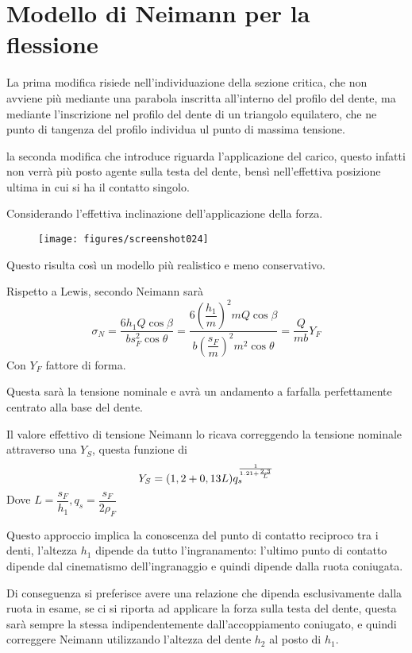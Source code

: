 \documentclass[a4paper, 15pt]{article}
\begin{document}
\section{Modello di Neimann per la flessione}
\begin{adjustwidth}{2in}{}	
	La prima modifica risiede nell'individuazione della sezione critica, che non avviene più mediante una parabola inscritta all'interno del profilo del dente, ma mediante l'inscrizione nel profilo del dente di un triangolo equilatero, che ne punto di tangenza del profilo individua ul punto di massima tensione. 
	
	la seconda modifica che introduce riguarda l'applicazione del carico, questo infatti non verrà più posto agente sulla testa del dente, bensì nell'effettiva posizione ultima in cui si ha il contatto singolo. 
	
	Considerando l'effettiva inclinazione dell'applicazione della forza. 
	\begin{figure}[H]
		\centering
		\texttt{[image: figures/screenshot024]}
		\label{fig:screenshot024}
	\end{figure}
	Questo risulta così un modello più realistico e meno conservativo.\newline 
	
	Rispetto a Lewis, secondo Neimann sarà 
	\[\sigma_N = \dfrac{6h_1Q\cos\beta}{bs_F^2\cos\theta} = \dfrac{6\left(\dfrac{h_1}{m}\right)^2mQ\cos\beta}{b\left(\dfrac{s_F}{m}\right)^2m^2\cos\theta} = \dfrac{Q}{mb}Y_F\] 
	Con $Y_F$ fattore di forma. 
	
	Questa sarà la tensione nominale e avrà un andamento a farfalla perfettamente centrato alla base del dente. \newline 
	
	Il valore effettivo di tensione Neimann lo ricava correggendo la tensione nominale attraverso una $Y_S$, questa funzione di 
	\[Y_S=(1,2+0,13L)q_s^{{1\over1.21 + {2.3\over L}}}\]
	Dove $L=\dfrac{s_F}{h_1}, q_s = \dfrac{s_F}{2\rho_F}$ 
	
	Questo approccio implica la conoscenza  del punto di contatto reciproco tra i denti, l'altezza $h_1$ dipende da tutto l'ingranamento: l'ultimo punto di contatto dipende dal cinematismo dell'ingranaggio e quindi dipende dalla ruota coniugata. \newline
	
	Di conseguenza si preferisce avere una relazione che dipenda esclusivamente dalla ruota in esame, se ci si riporta ad applicare la forza sulla testa del dente, questa sarà sempre la stessa indipendentemente dall'accoppiamento coniugato, e quindi correggere Neimann utilizzando l'altezza del dente $h_2$ al posto di $h_1$. 
	

\end{adjustwidth}
\end{document}
